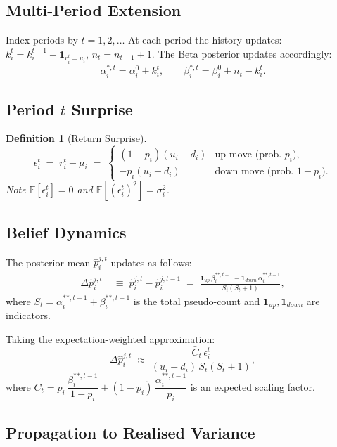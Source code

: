 \documentclass[12pt,a4paper]{article}
\newtheorem{definition}{Definition}[section]
\newcommand{\E}{\mathbb{E}}
\newcommand{\1}{\mathbf{1}}
\begin{document}
\subsection{Multi-Period Extension}

Index periods by $t = 1, 2, \ldots$ At each period the history updates: $k_i^t = k_i^{t-1} + \1_{r_i^t = u_i}$, $n_t = n_{t-1} + 1$. The Beta posterior updates accordingly:
\[
  \alpha_i^{*,t} = \alpha_i^0 + k_i^t, \qquad \beta_i^{*,t} = \beta_i^0 + n_t - k_i^t.
\]

\subsection{Period $t$ Surprise}

\begin{definition}[Return Surprise]
\[
  \epsilon_i^t \;=\; r_i^t - \mu_i
  \;=\;
  \begin{cases}
    (1-p_i)(u_i-d_i) & \text{up move (prob.\ } p_i\text{)},\\
    -p_i(u_i-d_i) & \text{down move (prob.\ } 1-p_i\text{)}.
  \end{cases}
\]
Note $\E[\epsilon_i^t] = 0$ and $\E[(\epsilon_i^t)^2] = \sigma_i^2$.
\end{definition}

\subsection{Belief Dynamics}

The posterior mean $\hat{p}_i^{j,t}$ updates as follows:
\begin{align}
  \Delta\hat{p}_i^{j,t}
  &\;\equiv\; \hat{p}_i^{j,t} - \hat{p}_i^{j,t-1}
  \;=\;
  \frac{\1_{up}\,\beta_i^{**,t-1} - \1_{down}\,\alpha_i^{**,t-1}}{S_t(S_t+1)},
  \label{eq:belief_dynamics}
\end{align}
where $S_t = \alpha_i^{**,t-1} + \beta_i^{**,t-1}$ is the total pseudo-count and $\1_{up}, \1_{down}$ are indicators.

Taking the expectation-weighted approximation:
\begin{equation}
  \Delta\hat{p}_i^{j,t}
  \;\approx\;
  \frac{\bar{C}_t\,\epsilon_i^t}{(u_i-d_i)\,S_t(S_t+1)},
  \label{eq:belief_approx}
\end{equation}
where $\bar{C}_t = p_i\,\dfrac{\beta_i^{**,t-1}}{1-p_i} + (1-p_i)\,\dfrac{\alpha_i^{**,t-1}}{p_i}$ is an expected scaling factor.

\subsection{Propagation to Realised Variance}
\end{document}
